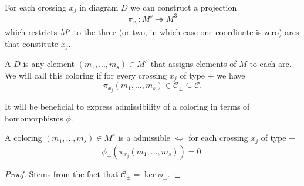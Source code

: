 For each crossing $x_j$ in diagram $D$ we can construct a projection 
$$\pi_{x_j}:M^s\twoheadrightarrow M^3$$
which restricts $M^s$ to the three (or two, in which case one coordinate is zero) arcs that constitute $x_j$.

\begin{definition}
  A  $D$ is any element $(m_1,..., m_s)\in M^s$ that assigns elements of $M$ to each arc. We will call this coloring  if for every crossing $x_j$ of type $\pm$ we have 
  $$\pi_{x_j}(m_1,..., m_s)\in \mathcal{C}_\pm\subseteq\mathcal{C}.$$
\end{definition}


It will be beneficial to express admissibility of a coloring in terms of homomorphisms $\phi$.
\begin{proposition}\label{proposition male kernel kolorowania}
  A coloring $(m_1,..., m_s)\in M^s$ is a admissible $\iff$ for each crossing $x_j$ of type $\pm$ 
  $$\phi_\pm(\pi_{x_j}(m_1,...,m_s))=0.$$
\end{proposition}

\begin{proof}
  Stems from the fact that $\mathcal{C}_\pm=\ker\phi_\pm$.
\end{proof}

